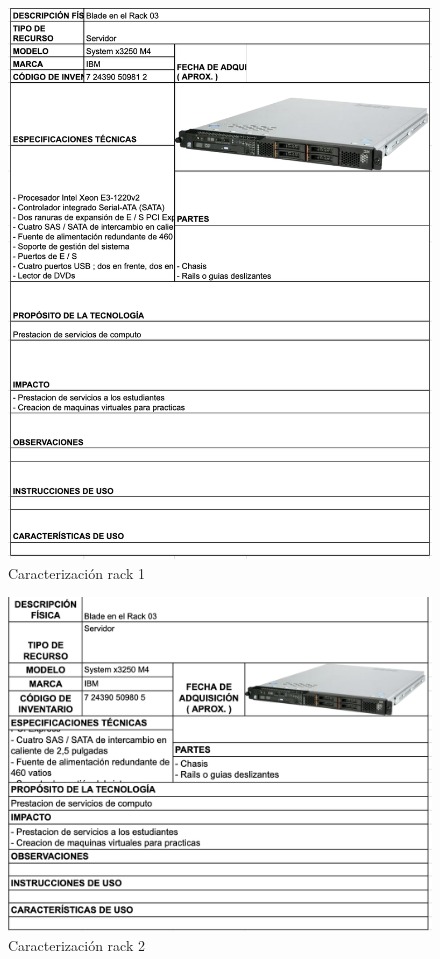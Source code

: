 \begin{figure}[H]
    \centering
    \includegraphics[width=\textwidth] {tablas-images/cp1/racks/rack-1.png}
    \caption{Caracterización rack 1}\label{fig:rack-1}
\end{figure}

\begin{figure}[H]
    \centering
    \includegraphics[width=\textwidth] {tablas-images/cp1/racks/rack-2.png}
    \caption{Caracterización rack 2}\label{fig:rack-2}
\end{figure}

